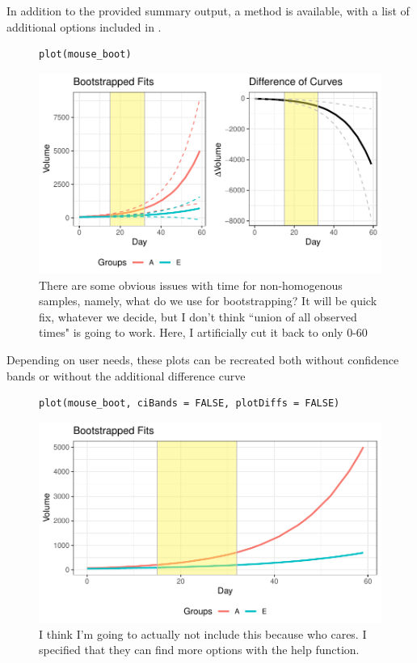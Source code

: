 In addition to the provided summary output, a  method is available, with a list of additional options included in .

\begin{figure}[H]
\centering
\begin{BVerbatim}
plot(mouse_boot)
\end{BVerbatim}

\includegraphics{img/mouse_boot_plot.pdf}
\caption{There are some obvious issues with time for non-homogenous samples, namely, what do we use for bootstrapping? It will be quick fix, whatever we decide, but I don't think ``union of all observed times" is going to work. Here, I artificially cut it back to only 0-60}
\end{figure}

Depending on user needs, these plots can be recreated both without confidence bands or without the additional difference curve

\begin{figure}[H]
\centering
\begin{BVerbatim}
plot(mouse_boot, ciBands = FALSE, plotDiffs = FALSE)

\end{BVerbatim}

\includegraphics{img/mouse_boot_plot_extra.pdf}
\caption{I think I'm going to actually not include this because who cares. I specified that they can find more options with the help function.}
\end{figure}


